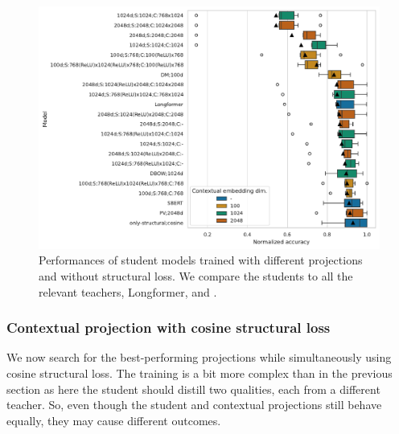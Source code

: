 \begin{figure}

  \centering

  \includegraphics[width=\textwidth]{img/projections_contextual.pdf}

  \caption{Performances of student models trained with different projections
  and without structural loss. We compare the students to all the relevant
  teachers, Longformer, and .}

  \label{fig:projections_contextual}

\end{figure}

\subsubsection{Contextual projection with cosine structural
loss}\label{section:projections_cos}

We now search for the best-performing projections while simultaneously using
cosine structural loss. The training is a bit
more complex than in the previous section as here the student should distill two qualities, each from a
different teacher. So, even though the student and contextual
projections still behave equally, they may cause different outcomes.


